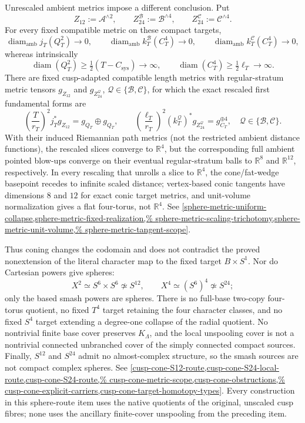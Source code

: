 \begin{enumerate}[leftmargin=1.8em,itemsep=.65em]
Unrescaled ambient metrics impose a different conclusion.  Put
\[
 Z_{12}:=\mathcal A^{\wedge2},\qquad
 Z_{24}^{\mathcal B}:=\mathcal B^{\wedge4},\qquad
 Z_{24}^{\mathcal C}:=\mathcal C^{\wedge4}.
\]
For every fixed compatible metric on these compact targets,
\[
 \operatorname{diam}_{\mathrm{amb}}j_T(Q_T^2)\to0,
 \qquad
 \operatorname{diam}_{\mathrm{amb}}k_T^{\mathcal B}(C_T^4)\to0,
 \qquad
 \operatorname{diam}_{\mathrm{amb}}k_T^{\mathcal C}(C_T^4)\to0,
\]
whereas intrinsically
\[
 \operatorname{diam}(Q_T^2)\ge\tfrac12(T-C_{\mathrm{sys}})\to\infty,
 \qquad \operatorname{diam}(C_T^4)\ge\tfrac12\ell_T\to\infty.
\]
There are fixed cusp-adapted compatible length metrics with regular-stratum
metric tensors \(g_{Z_{12}}\) and \(g_{Z_{24}^{\mathcal Q}}\),
\(\mathcal Q\in\{\mathcal B,\mathcal C\}\), for which the exact rescaled first
fundamental forms are
\[
 \left(\frac{T}{r_T}\right)^2j_T^*g_{Z_{12}}
 =g_{Q_T}\oplus g_{Q_T},
 \qquad
 \left(\frac{\ell_T}{r_T}\right)^2
 (k_T^{\mathcal Q})^*g_{Z_{24}^{\mathcal Q}}
 =g_{C_T}^{\oplus4},
 \quad\mathcal Q\in\{\mathcal B,\mathcal C\}.
\]
With their induced Riemannian path metrics (not the restricted ambient
distance functions), the rescaled slices converge to \(\mathbb R^4\), but the corresponding full
ambient pointed blow-ups converge on their eventual regular-stratum balls to
\(\mathbb R^8\) and \(\mathbb R^{12}\), respectively.  In every rescaling
that unrolls a slice to \(\mathbb R^4\), the cone/fat-wedge basepoint recedes
to infinite scaled distance; vertex-based conic tangents have dimensions
\(8\) and \(12\) for exact conic target metrics, and unit-volume normalization
gives a flat four-torus, not
\(\mathbb R^4\).  See
\cref{sphere-metric-uniform-collapse,sphere-metric-fixed-realization,%
sphere-metric-scaling-trichotomy,sphere-metric-unit-volume,%
sphere-metric-tangent-scope}.

Thus coning changes the codomain and does not contradict the proved
nonextension of the literal character map to the fixed target
\(B\times S^1\).  Nor do Cartesian powers give spheres:
\[
 X^2\simeq S^6\times S^6\not\simeq S^{12},\qquad
 X^4\simeq(S^6)^4\not\simeq S^{24};
\]
only the based smash powers are spheres.  There is no full-base two-copy
four-torus quotient, no fixed \(T^4\) target retaining the four character
classes, and no fixed \(S^4\) target extending a degree-one collapse of the
radial quotient.  No nontrivial finite base cover preserves
\(K_\Lambda\), and the local unspooling cover is not a nontrivial connected
unbranched cover of the simply connected compact sources.  Finally,
\(S^{12}\) and \(S^{24}\) admit no almost-complex structure, so the smash
sources are not compact complex spheres.  See
\cref{cusp-cone-S12-route,cusp-cone-S24-local-route,cusp-cone-S24-route,%
cusp-cone-metric-scope,cusp-cone-obstructions,%
cusp-cone-explicit-carriers,cusp-cone-target-homotopy-types}.
Every construction in this sphere-route item uses the native quotients of the
original, unscaled cusp fibres; none uses the ancillary finite-cover
unspooling from the preceding item.


\end{enumerate}
